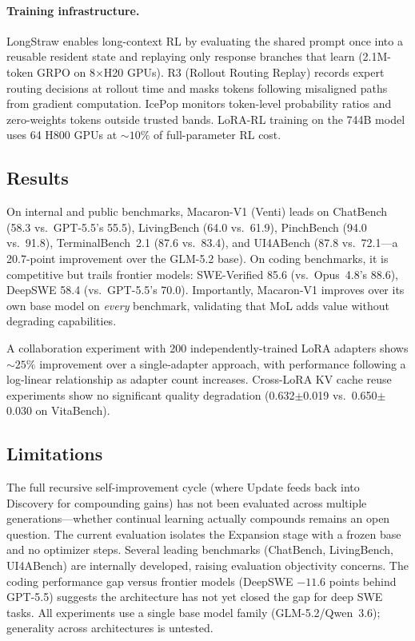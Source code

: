 \documentclass[11pt,a4paper]{article}
\begin{document}
\paragraph{Training infrastructure.} LongStraw enables long-context RL by evaluating the shared prompt once into a reusable resident state and replaying only response branches that learn (2.1M-token GRPO on 8$\times$H20 GPUs). R3 (Rollout Routing Replay) records expert routing decisions at rollout time and masks tokens following misaligned paths from gradient computation. IcePop monitors token-level probability ratios and zero-weights tokens outside trusted bands. LoRA-RL training on the 744B model uses 64 H800 GPUs at ${\sim}10\%$ of full-parameter RL cost.

\subsection{Results}

On internal and public benchmarks, Macaron-V1 (Venti) leads on ChatBench (58.3 vs.\ GPT-5.5's 55.5), LivingBench (64.0 vs.\ 61.9), PinchBench (94.0 vs.\ 91.8), TerminalBench~2.1 (87.6 vs.\ 83.4), and UI4ABench (87.8 vs.\ 72.1---a 20.7-point improvement over the GLM-5.2 base). On coding benchmarks, it is competitive but trails frontier models: SWE-Verified 85.6 (vs.\ Opus~4.8's 88.6), DeepSWE 58.4 (vs.\ GPT-5.5's 70.0). Importantly, Macaron-V1 improves over its own base model on \emph{every} benchmark, validating that MoL adds value without degrading capabilities.

A collaboration experiment with 200 independently-trained LoRA adapters shows ${\sim}25\%$ improvement over a single-adapter approach, with performance following a log-linear relationship as adapter count increases. Cross-LoRA KV cache reuse experiments show no significant quality degradation (0.632$\pm$0.019 vs.\ 0.650$\pm$0.030 on VitaBench).

\subsection{Limitations}

The full recursive self-improvement cycle (where Update feeds back into Discovery for compounding gains) has not been evaluated across multiple generations---whether continual learning actually compounds remains an open question. The current evaluation isolates the Expansion stage with a frozen base and no optimizer steps. Several leading benchmarks (ChatBench, LivingBench, UI4ABench) are internally developed, raising evaluation objectivity concerns. The coding performance gap versus frontier models (DeepSWE $-11.6$ points behind GPT-5.5) suggests the architecture has not yet closed the gap for deep SWE tasks. All experiments use a single base model family (GLM-5.2/Qwen~3.6); generality across architectures is untested.
\end{document}
